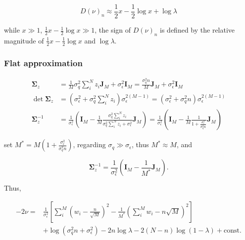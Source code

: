 \begin{equation}
    D(\nu)_n \approx \frac{1}{2}x - \frac{1}{2}\log x + \log\lambda
\end{equation}

while $x \gg 1$, $\frac{1}{2}x - \frac{1}{2}\log x \gg 1$, the sign of $D(\nu)_n$ is defined by the relative magnitude of $\frac{1}{2}x - \frac{1}{2}\log x$ and $\log\lambda$. 

\subsubsection{Flat approximation}

\begin{equation}
\begin{aligned}
    \bm{\Sigma}_z &= \frac{1}{M}\sigma_q^2\sum_i^N z_i\bm{J}_M + \sigma_\epsilon^2\bm{I}_M = \frac{\sigma_q^2n}{M}\bm{J}_M+\sigma_\epsilon^2\bm{I}_M \\
    \det\bm{\Sigma}_z &= (\sigma_\epsilon^2 + \sigma_q^2\sum_i^N z_i)\sigma_\epsilon^{2(M-1)} = (\sigma_\epsilon^2 + \sigma_q^2n)\sigma_\epsilon^{2(M-1)} \\
    \bm{\Sigma}_z^{-1} &= \frac{1}{\sigma_\epsilon^2}\left(\bm{I}_M - \frac{1}{M}\frac{\sigma_q^2\sum_i^N z_i}{\sigma_q^2\sum_i^N z_i+\sigma_\epsilon^2}\bm{J}_M\right) = \frac{1}{\sigma_\epsilon^2}\left(\bm{I}_M - \frac{1}{M}\frac{1}{1+\frac{\sigma_\epsilon^2}{\sigma_q^2n}}\bm{J}_M\right)
\end{aligned}
\end{equation}

set $M^\ast = M(1+\frac{\sigma_\epsilon^2}{\sigma_q^2n})$, regarding $\sigma_q\gg\sigma_\epsilon$, thus $M^\ast\approx M$, and

\begin{equation}
    \bm{\Sigma}_z^{-1} = \frac{1}{\sigma_\epsilon^2}\left(\bm{I}_M - \frac{1}{M^\ast}\bm{J}_M\right).
\end{equation}

Thus, 

\begin{equation}
\begin{aligned}
    -2\nu =& \frac{1}{\sigma_\epsilon^2}\left[\sum_i^M\left(w_i-\frac{n}{\sqrt{M}}\right)^2-\frac{1}{M^\ast}\left(\sum_i^M w_i-n\sqrt{M}\right)^2\right] \\
    &+ \log(\sigma_q^2n+\sigma_\epsilon^2) - 2n\log\lambda - 2(N-n)\log(1-\lambda) + \mathrm{const}.
\end{aligned}
\end{equation}


